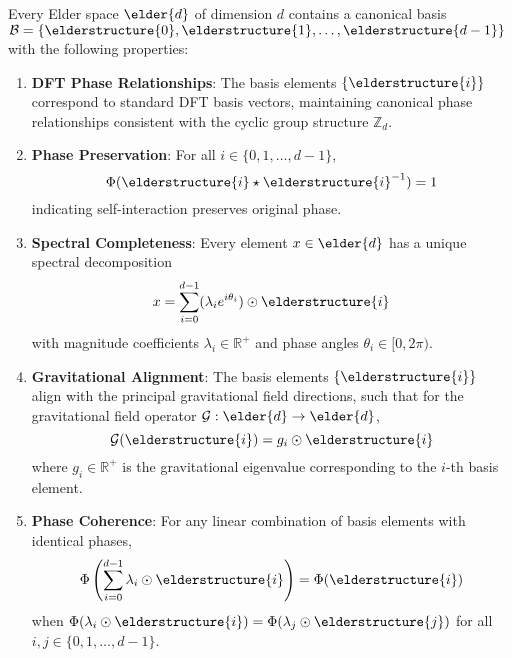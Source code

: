 \begin{theorem}
Every Elder space $\elder{d}$ of dimension $d$ contains a canonical basis $\mathcal{B} = \{\elderstructure{0}, \elderstructure{1}, \ldots, \elderstructure{d-1}\}$ with the following properties:
\begin{enumerate}
    \item \textbf{DFT Phase Relationships}: The basis elements $\{\elderstructure{i}\}$ correspond to standard DFT basis vectors, maintaining canonical phase relationships consistent with the cyclic group structure $\mathbb{Z}_d$.
    
    \item \textbf{Phase Preservation}: For all $i \in \{0, 1, \ldots, d-1\}$,
    \begin{equation}
        \Phi(\elderstructure{i} \star \elderstructure{i}^{-1}) = 1
    \end{equation}
    indicating self-interaction preserves original phase.
    
    \item \textbf{Spectral Completeness}: Every element $x \in \elder{d}$ has a unique spectral decomposition
    \begin{equation}
        x = \sum_{i=0}^{d-1} (\lambda_i e^{i\theta_i}) \odot \elderstructure{i}
    \end{equation}
    with magnitude coefficients $\lambda_i \in \mathbb{R}^+$ and phase angles $\theta_i \in [0, 2\pi)$.
    
    \item \textbf{Gravitational Alignment}: The basis elements $\{\elderstructure{i}\}$ align with the principal gravitational field directions, such that for the gravitational field operator $\mathcal{G}: \elder{d} \rightarrow \elder{d}$,
    \begin{equation}
        \mathcal{G}(\elderstructure{i}) = g_i \odot \elderstructure{i}
    \end{equation}
    where $g_i \in \mathbb{R}^+$ is the gravitational eigenvalue corresponding to the $i$-th basis element.
    
    \item \textbf{Phase Coherence}: For any linear combination of basis elements with identical phases,
    \begin{equation}
        \Phi\left(\sum_{i=0}^{d-1} \lambda_i \odot \elderstructure{i}\right) = \Phi(\elderstructure{i})
    \end{equation}
    when $\Phi(\lambda_i \odot \elderstructure{i}) = \Phi(\lambda_j \odot \elderstructure{j})$ for all $i,j \in \{0,1,\ldots,d-1\}$.
\end{enumerate}
\end{theorem}

